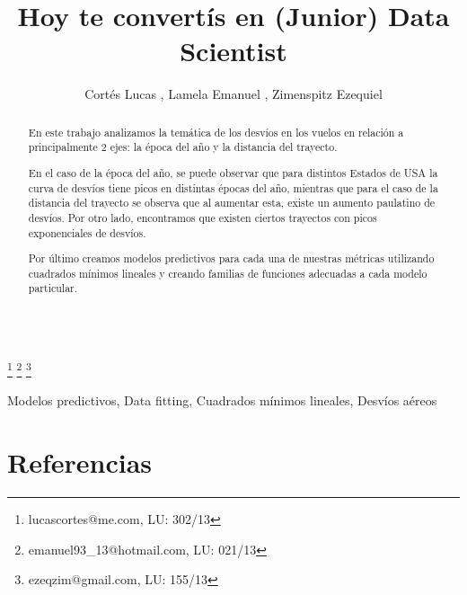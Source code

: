\documentclass{endm}
\begin{document}
\begin{verbatim}\end{verbatim}\vspace{2.5cm}

\begin{frontmatter}

\title{Hoy te convert\'is en (Junior) Data Scientist}

\author{Cort\'es Lucas , Lamela Emanuel , Zimenspitz Ezequiel }
\address{Universidad de Buenos Aires\\ Buenos Aires, Argentina}

\thanks[lucasemail]{lucascortes@me.com, LU: 302/13}
\thanks[emanuelemail]{emanuel93\_13@hotmail.com, LU: 021/13}
\thanks[ezequielemail]{ezeqzim@gmail.com, LU: 155/13}

\begin{abstract}

En este trabajo analizamos la tem\'atica de los desv\'ios en los vuelos en relaci\'on a principalmente 2 ejes: la \'epoca del a\~no y la distancia del trayecto. 

En el caso de la \'epoca del a\~no, se puede observar que para distintos Estados de USA la curva de desv\'ios tiene picos en distintas \'epocas del a\~no, mientras que para el caso de la distancia del trayecto se observa que al aumentar esta, existe un aumento paulatino de desv\'ios. Por otro lado, encontramos que existen ciertos trayectos con picos exponenciales de desv\'ios.

Por \'ultimo creamos modelos predictivos para cada una de nuestras m\'etricas utilizando cuadrados m\'inimos lineales y creando familias de funciones adecuadas a cada modelo particular.

\end{abstract}

\begin{keyword}
Modelos predictivos, Data fitting, Cuadrados m\'inimos lineales, Desv\'ios a\'ereos
\end{keyword}

\end{frontmatter}









\section{Referencias}



\end{document}
